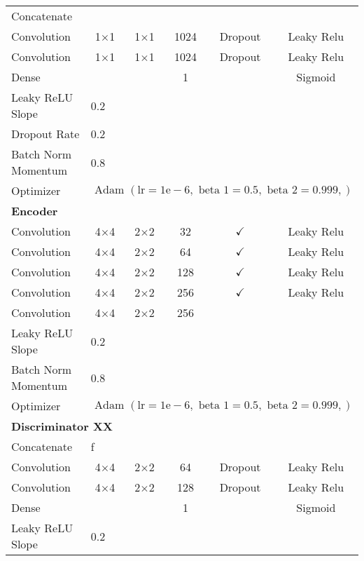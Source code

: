 \begin{table}[]
{\begin{tabular}{llcccc}
			Concatenate &\multicolumn{5}{l}{} \\
			Convolution & \multicolumn{1}{c}{1$\times$1} & 1$\times$1 & 1024 & Dropout & Leaky Relu \\
			Convolution & \multicolumn{1}{c}{1$\times$1} & 1$\times$1 & 1024 & Dropout & Leaky Relu \\
			Dense & \multicolumn{1}{c}{} &  & 1 &  & Sigmoid \\ \hline
			Leaky ReLU Slope & \multicolumn{5}{l}{0.2} \\
			Dropout Rate & \multicolumn{5}{l}{0.2} \\
			Batch Norm Momentum & \multicolumn{5}{l}{0.8} \\
			Optimizer & \multicolumn{5}{l}{$\text { Adam }(\mathrm{lr}=1 \mathrm{e}-6, \text { beta } 1=0.5, \text { beta } 2=0.999,)$} \\ \hline
			\multicolumn{6}{l}{\textbf{Encoder}} \\
			Convolution & \multicolumn{1}{c}{4$\times$4} & 2$\times$2 & 32 & $\checkmark$ & Leaky Relu \\
			Convolution & \multicolumn{1}{c}{4$\times$4} & 2$\times$2 & 64 & $\checkmark$ & Leaky Relu \\
			Convolution & \multicolumn{1}{c}{4$\times$4} & 2$\times$2 & 128 & $\checkmark$ & Leaky Relu \\
			Convolution & \multicolumn{1}{c}{4$\times$4} & 2$\times$2 & 256 & $\checkmark$ & Leaky Relu \\
			Convolution & \multicolumn{1}{c}{4$\times$4} & 2$\times$2 & 256 &  &  \\ \hline
			Leaky ReLU Slope & \multicolumn{5}{l}{0.2} \\
			Batch Norm Momentum & \multicolumn{5}{l}{0.8} \\
			Optimizer & \multicolumn{5}{l}{$\text { Adam }(\mathrm{lr}=1 \mathrm{e}-6, \text { beta } 1=0.5, \text { beta } 2=0.999,)$} \\ \hline
			\multicolumn{6}{l}{\textbf{Discriminator XX}} \\
			Concatenate &\multicolumn{5}{l}{f} \\
			Convolution & \multicolumn{1}{c}{4$\times$4} & 2$\times$2 & 64 & Dropout & Leaky Relu \\
			Convolution & \multicolumn{1}{c}{4$\times$4} & 2$\times$2 & 128 & Dropout & Leaky Relu \\
			Dense & \multicolumn{1}{c}{} &  & 1 &  & Sigmoid \\ \hline
			Leaky ReLU Slope & \multicolumn{5}{l}{0.2} \\

\end{tabular}}
\end{table}
